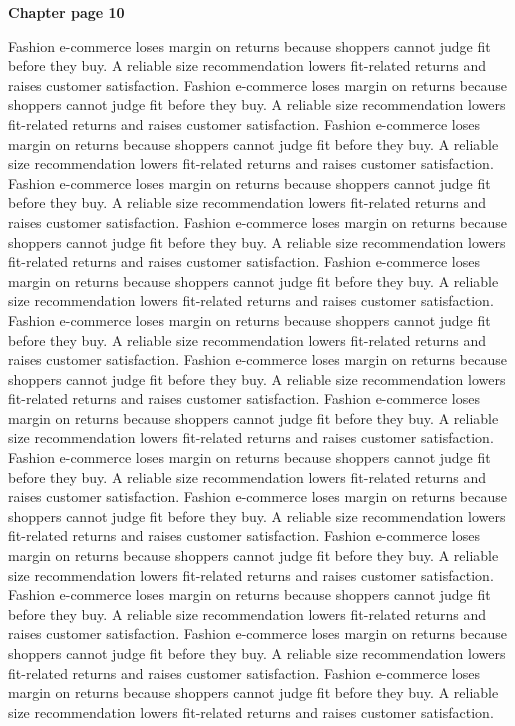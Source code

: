 \documentclass[a4paper,11pt]{article}
\begin{document}
{\headfont\bfseries\Large Chapter page 10}\par\medskip
Fashion e-commerce loses margin on returns because shoppers cannot judge fit before they buy. A reliable size recommendation lowers fit-related returns and raises customer satisfaction. Fashion e-commerce loses margin on returns because shoppers cannot judge fit before they buy. A reliable size recommendation lowers fit-related returns and raises customer satisfaction. Fashion e-commerce loses margin on returns because shoppers cannot judge fit before they buy. A reliable size recommendation lowers fit-related returns and raises customer satisfaction. Fashion e-commerce loses margin on returns because shoppers cannot judge fit before they buy. A reliable size recommendation lowers fit-related returns and raises customer satisfaction. Fashion e-commerce loses margin on returns because shoppers cannot judge fit before they buy. A reliable size recommendation lowers fit-related returns and raises customer satisfaction. 
Fashion e-commerce loses margin on returns because shoppers cannot judge fit before they buy. A reliable size recommendation lowers fit-related returns and raises customer satisfaction. Fashion e-commerce loses margin on returns because shoppers cannot judge fit before they buy. A reliable size recommendation lowers fit-related returns and raises customer satisfaction. Fashion e-commerce loses margin on returns because shoppers cannot judge fit before they buy. A reliable size recommendation lowers fit-related returns and raises customer satisfaction. Fashion e-commerce loses margin on returns because shoppers cannot judge fit before they buy. A reliable size recommendation lowers fit-related returns and raises customer satisfaction. Fashion e-commerce loses margin on returns because shoppers cannot judge fit before they buy. A reliable size recommendation lowers fit-related returns and raises customer satisfaction. 
Fashion e-commerce loses margin on returns because shoppers cannot judge fit before they buy. A reliable size recommendation lowers fit-related returns and raises customer satisfaction. Fashion e-commerce loses margin on returns because shoppers cannot judge fit before they buy. A reliable size recommendation lowers fit-related returns and raises customer satisfaction. Fashion e-commerce loses margin on returns because shoppers cannot judge fit before they buy. A reliable size recommendation lowers fit-related returns and raises customer satisfaction. Fashion e-commerce loses margin on returns because shoppers cannot judge fit before they buy. A reliable size recommendation lowers fit-related returns and raises customer satisfaction. Fashion e-commerce loses margin on returns because shoppers cannot judge fit before they buy. A reliable size recommendation lowers fit-related returns and raises customer satisfaction. \newpage
\end{document}
